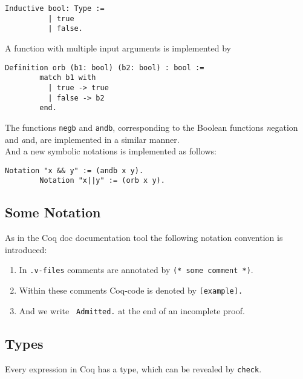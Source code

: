	    \label{Def:booleans}
	    \begin{lstlisting}[caption= \lstinline!bool!]    
	    Inductive bool: Type :=
	      | true
	      | false.
	    \end{lstlisting}
	     A function with multiple input arguments is implemented by
	    \begin{lstlisting}[caption = \lstinline!orb!]
	    Definition orb (b1: bool) (b2: bool) : bool :=
	    match b1 with
		  | true -> true
		  | false -> b2
	    end.
	    \end{lstlisting}    
	    The functions \lstinline!negb! and \lstinline!andb!, corresponding to the Boolean functions {\emph negation} and {\emph and}, are implemented in a similar manner.\\   
	    And a new symbolic notations is implemented as follows:
	    \begin{lstlisting}[caption= introducing a new notation]
	    Notation "x && y" := (andb x y).
	    Notation "x||y" := (orb x y).
	    \end{lstlisting}
	    
	\subsection{Some Notation}
	    As in the Coq doc documentation tool the following notation convention is introduced:
	     
	    \begin{enumerate}
	     \item In \texttt{.v-files} comments are annotated by \lstinline!(* some comment *)!. 
	     \item Within these comments Coq-code is denoted by \lstinline![example].! 
	     \item And we write \lstinline! Admitted.! at the end of an incomplete proof.    
	     \end{enumerate}
	     
	\subsection{Types}
	     Every expression in Coq has a type, which can be revealed by \lstinline!check!. 

